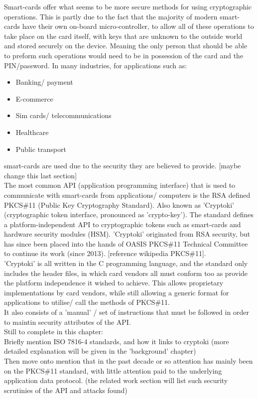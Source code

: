 \documentclass[a4paper]{report}
\begin{document}
Smart-cards offer what seems to be more secure methods for using cryptographic operations. This is partly due to the fact that the majority of modern smart-cards have their own on-board micro-controller, to allow all of these operations to take place on the card itself, with keys that are unknown to the outside world and stored securely on the device. Meaning the only person that should be able to preform such operations would need to be in possession of the card and the PIN/password. In many industries, for applications such as:
\begin{itemize}
\item Banking/ payment
\item E-commerce
\item Sim cards/ telecommunications
\item Healthcare
\item Public transport
\end{itemize}
smart-cards are used due to the security they are believed to provide. [maybe change this last section]\\

The most common API (application programming interface) that is used to communicate with smart-cards from applications/ computers is the RSA defined PKCS\#11 (Public Key Cryptography Standard). Also known as 'Cryptoki' (cryptographic token interface, pronounced as 'crypto-key'). The standard defines a platform-independent API to cryptographic tokens such as smart-cards and hardware security modules (HSM). 'Cryptoki' originated from RSA security, but has since been placed into the hands of OASIS PKCS\#11 Technical Committee to continue its work (since 2013). [reference wikipedia PKCS\#11].\\

'Cryptoki' is all written in the C programming language, and the standard only includes the header files, in which card vendors all must conform too as provide the platform independence it wished to achieve. This allows proprietary implementations by card vendors, while still allowing a generic format for applications to utilise/ call the methods of PKCS\#11.\\
It also consists of a 'manual' / set of instructions that must be followed in order to maintin security attributes of the API.\\


Still to complete in this chapter:\\
Briefly mention ISO 7816-4 standards, and how it links to cryptoki (more detailed explanation will be given in the 'background' chapter)\\
Then move onto mention that in the past decade or so attention has mainly been on the PKCS\#11 standard, with little attention paid to the underlying application data protocol. (the related work section will list such security scrutinies of the API and attacks found)\\
\end{document}
